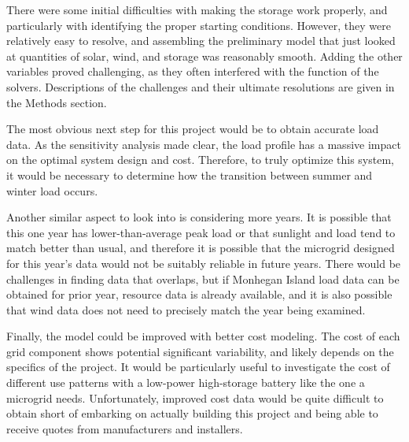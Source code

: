 \documentclass{article}
\begin{document}
There were some initial difficulties with making the storage work properly, and particularly with identifying the proper starting conditions.  However, they were relatively easy to resolve, and assembling the preliminary model that just looked at quantities of solar, wind, and storage was reasonably smooth.  Adding the other variables proved challenging, as they often interfered with the function of the solvers.  Descriptions of the challenges and their ultimate resolutions are given in the Methods section.

The most obvious next step for this project would be to obtain accurate load data.  As the sensitivity analysis made clear, the load profile has a massive impact on the optimal system design and cost.  Therefore, to truly optimize this system, it would be necessary to determine how the transition between summer and winter load occurs.

Another similar aspect to look into is considering more years.  It is possible that this one year has lower-than-average peak load or that sunlight and load tend to match better than usual, and therefore it is possible that the microgrid designed for this year's data would not be suitably reliable in future years.  There would be challenges in finding data that overlaps, but if Monhegan Island load data can be obtained for prior year, resource data is already available, and it is also possible that wind data does not need to precisely match the year being examined.

Finally, the model could be improved with better cost modeling.  The cost of each grid component shows potential significant variability, and likely depends on the specifics of the project.  It would be particularly useful to investigate the cost of different use patterns with a low-power high-storage battery like the one a microgrid needs.  Unfortunately, improved cost data would be quite difficult to obtain short of embarking on actually building this project and being able to receive quotes from manufacturers and installers.



\end{document}
